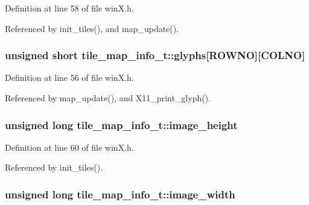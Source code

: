 Definition at line 58 of file win\+X.\+h.



Referenced by init\+\_\+tiles(), and map\+\_\+update().

\hypertarget{structtile__map__info__t_a8d55ef351991c46cbbec36471b28c19d}{
\subsubsection[{glyphs}]{\setlength{\rightskip}{0pt plus 5cm}unsigned short tile\+\_\+map\+\_\+info\+\_\+t\+::glyphs\mbox{[}{\bf R\+O\+W\+N\+O}\mbox{]}\mbox{[}{\bf C\+O\+L\+N\+O}\mbox{]}}}\label{structtile__map__info__t_a8d55ef351991c46cbbec36471b28c19d}


Definition at line 56 of file win\+X.\+h.



Referenced by map\+\_\+update(), and X11\+\_\+print\+\_\+glyph().

\hypertarget{structtile__map__info__t_a76968db088c03de48d2412082d5494f0}{
\subsubsection[{image\+\_\+height}]{\setlength{\rightskip}{0pt plus 5cm}unsigned long tile\+\_\+map\+\_\+info\+\_\+t\+::image\+\_\+height}}\label{structtile__map__info__t_a76968db088c03de48d2412082d5494f0}


Definition at line 60 of file win\+X.\+h.



Referenced by init\+\_\+tiles().

\hypertarget{structtile__map__info__t_aaaaff269c12a93230ddd2a565690871a}{
\subsubsection[{image\+\_\+width}]{\setlength{\rightskip}{0pt plus 5cm}unsigned long tile\+\_\+map\+\_\+info\+\_\+t\+::image\+\_\+width}}\label{structtile__map__info__t_aaaaff269c12a93230ddd2a565690871a}


